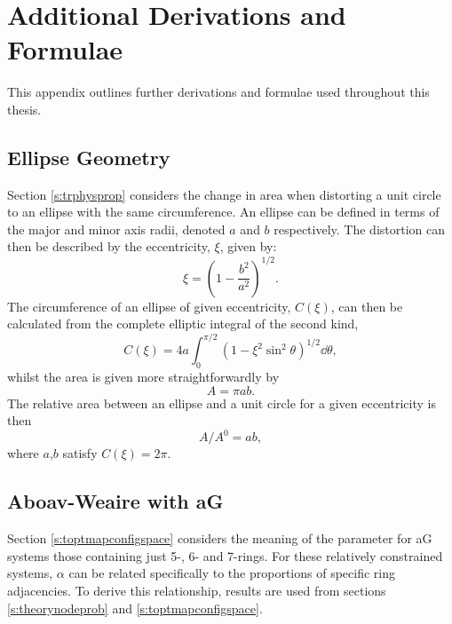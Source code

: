 \chapter[Additional Derivations and Formulae]{Additional Derivations and \\ Formulae}
\label{app:derivations}
\stoptocwriting
This appendix outlines further derivations and formulae used throughout this thesis.

\section{Ellipse Geometry}
\label{app:derivellipse}

Section \ref{s:trphysprop} considers the change in area when distorting a unit circle to an ellipse with the same circumference.
An ellipse can be defined in terms of the major and minor axis radii, denoted $a$ and $b$ respectively.
The distortion can then be described by the eccentricity, $\xi$, given by:
\begin{equation}
	\xi = \left(1-\frac{b^2}{a^2}\right)^{1/2}.
\end{equation}
The circumference of an ellipse of given eccentricity, $C\left(\xi\right)$, can then be calculated from the complete elliptic integral of the second kind,
\begin{equation}
	\label{eq:ellipsec}
	C\left(\xi\right) = 4a\int_0^{\pi/2} \left(1-\xi^2\sin^2\theta\right)^{1/2}\dd\theta,
\end{equation}
whilst the area is given more straightforwardly by
\begin{equation}
	A = \pi ab.
\end{equation}
The relative area between an ellipse and a unit circle for a given eccentricity is then
\begin{equation}
 	A/A^0=ab,
\end{equation} 
where $a$,$b$ satisfy $C\left(\xi\right)=2\pi$.

\section{Aboav\--Weaire with aG}
\label{app:derivag}

Section \ref{s:toptmapconfigspace} considers the meaning of the \aw{} parameter for aG systems \ie{} those containing just 5\--, 6\-- and 7\--rings.
For these relatively constrained systems, $\alpha$ can be related specifically to the proportions of specific ring adjacencies.
To derive this relationship, results are used from sections \ref{s:theorynodeprob} and \ref{s:toptmapconfigspace}.

